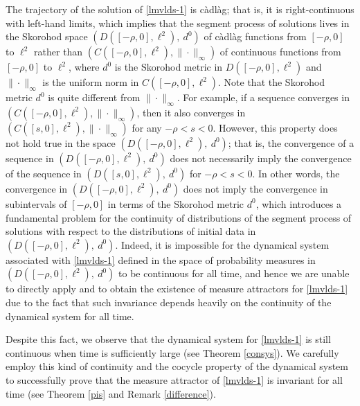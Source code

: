 \documentclass[11pt]{article}
\numberwithin{equation}{section}
\theoremstyle{plain}
\begin{document}
   
   The trajectory of the solution
   of \eqref{lmvlds-1}
   is 
    c\`adl\`ag; that is,
    it is right-continuous with left-hand limits,
    which implies that
    the segment process of solutions
    lives  in the 
    Skorohod space
     $ 
    ( D([-\rho,0], \ell^2), \ d^0)$
    of   c\`adl\`ag functions from 
    $[-\rho,0]$ to $ \ell^2$
    rather than
    $  ( C([-\rho,0], \ell^2), \| \cdot \|_{\infty})$
    of continuous functions
     from 
    $[-\rho,0]$ to $ \ell^2$,
    where
    $d^0$ is the 
     Skorohod metric 
     in  $ 
  D([-\rho,0], \ell^2)$
  and  $  \| \cdot \|_{\infty} $
  is the uniform norm
  in  $ C([-\rho,0], \ell^2)$.
  Note that the 
     Skorohod metric 
     $d^0$ is quite different from 
     $\|\cdot \|_{\infty}$.
     For example,
     if a sequence converges
     in 
   $  ( C([-\rho,0], \ell^2), \| \cdot \|_{\infty})$,
   then it also converges
   in  $  ( C([s, 0], \ell^2), \| \cdot \|_{\infty})$
   for any $-\rho <s <0$.
   However, this property does not hold
   true 
   in the space
    $ 
    ( D([-\rho,0], \ell^2), \ d^0)$;
    that is,
   the convergence of a  sequence
    in
     $ 
    ( D([-\rho,0], \ell^2), \ d^0)$
    does  not necessarily  
  imply the convergence
  of the sequence
  in  $ 
    ( D([s,0], \ell^2), \ d^0)$
    for $ -\rho <s <0$.
      In other words,
    the convergence in
      $ 
    ( D([-\rho,0], \ell^2), \ d^0)$
    does not imply the 
    convergence
    in  subintervals
     of $[-\rho, 0]$
    in terms of the Skorohod metric
    $d^0$,
    which
    introduces a fundamental
    problem for the continuity
    of distributions of
    the segment process
    of solutions 
    with respect to
    the distributions of initial data
    in
     $ 
    ( D([-\rho,0], \ell^2), \ d^0)$.
   Indeed,
   it is impossible
   for the dynamical system associated with \eqref{lmvlds-1}
   defined in the space of probability measures
   in $( D([-\rho,0], \ell^2), \ d^0)$
   to be continuous for all time,
   and hence we are unable to  
   {directly
    apply \cite[Proposition 2.2]{SSW2026JDE} and \cite[Proposition 3.6]{bwang2012JDE} to obtain the existence of measure attractors} for \eqref{lmvlds-1}
   due to the fact that such invariance depends heavily on the continuity of the dynamical system for all time.
    
     
    Despite this fact,
    we  observe that the dynamical system for \eqref{lmvlds-1} is still continuous 
    when time is sufficiently large
    (see Theorem \ref{consys}).
    We carefully employ 
     this kind of continuity
     and the cocycle property
     of the dynamical system to successfully
  prove
  that  the measure attractor of \eqref{lmvlds-1} is 
  {invariant for all time
     (see Theorem \ref{pis} and Remark \ref{difference}).
     }
     
\end{document}
